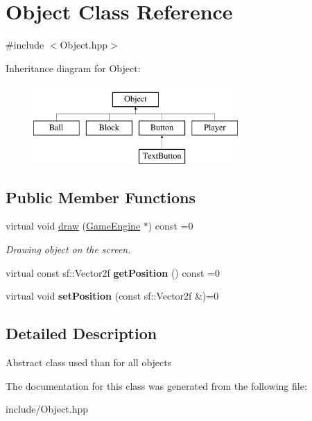 \hypertarget{class_object}{}\section{Object Class Reference}
\label{class_object}


{\ttfamily \#include $<$Object.\+hpp$>$}

Inheritance diagram for Object\+:\begin{figure}[H]
\begin{center}
\leavevmode
\includegraphics[height=3.000000cm]{class_object}
\end{center}
\end{figure}
\subsection*{Public Member Functions}
\begin{DoxyCompactItemize}
\item 
\mbox{\label{class_object_af9862406dcd271bd45580737df468af4}} 
virtual void \mbox{\hyperlink{class_object_af9862406dcd271bd45580737df468af4}{draw}} (\mbox{\hyperlink{class_game_engine}{Game\+Engine}} $\ast$) const =0
\begin{DoxyCompactList}\small\item\em Drawing object on the screen. \end{DoxyCompactList}\item 
\mbox{\label{class_object_a3fd6370b8cfc53e5e41d09704726c2d4}} 
virtual const sf\+::\+Vector2f {\bfseries get\+Position} () const =0
\item 
\mbox{\label{class_object_ac5c796bfa75dedf6d3bfc74685b2b77d}} 
virtual void {\bfseries set\+Position} (const sf\+::\+Vector2f \&)=0
\end{DoxyCompactItemize}


\subsection{Detailed Description}
Abstract class used than for all objects 

The documentation for this class was generated from the following file\+:\begin{DoxyCompactItemize}
\item 
include/Object.\+hpp\end{DoxyCompactItemize}
